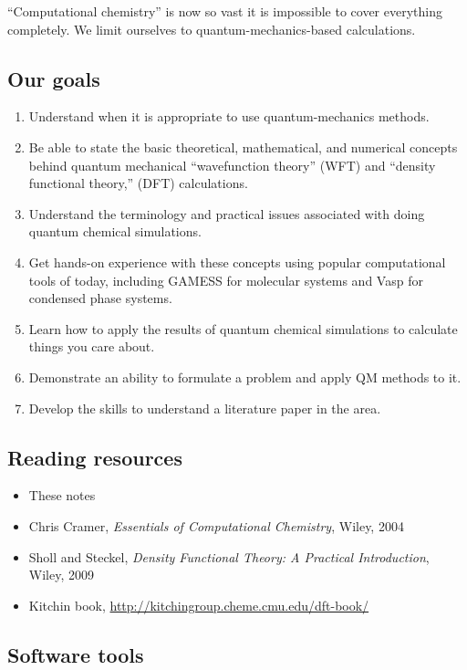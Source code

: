 \documentclass[11pt]{article}
\begin{document}
``Computational chemistry'' is now so vast it is impossible to cover
everything completely.  We limit ourselves to quantum-mechanics-based
calculations.

\subsection{Our goals}
\label{sec:org32a1af1}
\begin{enumerate}
\item Understand when it is appropriate to use quantum-mechanics methods.
\item Be able to state the basic theoretical, mathematical, and numerical
concepts behind quantum mechanical ``wavefunction theory'' (WFT) and
``density functional theory,'' (DFT) calculations.
\item Understand the terminology and practical issues associated with doing quantum chemical simulations.
\item Get hands-on experience with these concepts using popular
computational tools of today, including GAMESS for molecular systems and Vasp for condensed phase systems.
\item Learn how to apply the results of quantum chemical simulations to calculate
things you care about.
\item Demonstrate an ability to formulate a problem and apply QM methods to it.
\item Develop the skills to understand a literature paper in the area.
\end{enumerate}

\subsection{Reading resources}
\label{sec:org21f7713}
\begin{itemize}
\item These notes
\item Chris Cramer, \emph{Essentials of Computational Chemistry}, Wiley, 2004
\item Sholl and Steckel, \emph{Density Functional Theory: A Practical
Introduction}, Wiley, 2009
\item Kitchin book, \url{http://kitchingroup.cheme.cmu.edu/dft-book/}
\end{itemize}

\subsection{Software tools}
\label{sec:org6c528f2}
\end{document}

